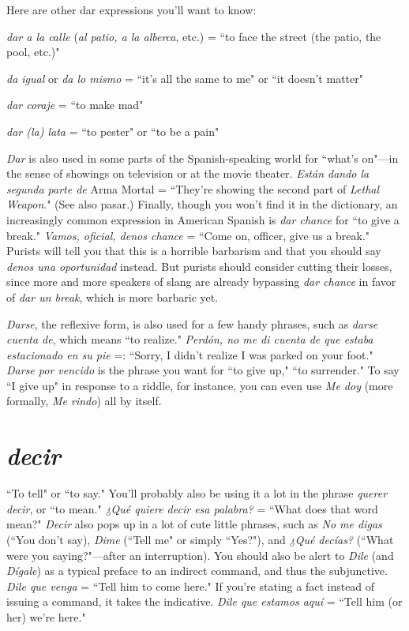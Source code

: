 Here are other dar expressions you'll want to know:

\bsk

\indu \emph{dar a la calle} (\emph{al patio, a la alberca}, etc.) = ``to face the street
(the patio, the pool, etc.)"

\indu \emph{da igual} or \emph{da lo mismo} = ``it's all the same to me" or ``it
doesn't matter"

\indu \emph{dar coraje} = ``to make mad"

\indu \emph{dar (la) lata} = ``to pester" or ``to be a pain"

\bsk

\emph{Dar} is also used in some parts of the Spanish-speaking world for
``what's on"---in the sense of showings on television or at the movie
theater. \emph{Están dando la segunda parte de} Arma Mortal = ``They're
showing the second part of \emph{Lethal Weapon}." (See also pasar.) Finally,
though you won't find it in the dictionary, an increasingly common expression in American Spanish is \emph{dar chance} for ``to give a break." \emph{Vamos, oficial, denos chance} = ``Come on, officer, give us a break." Purists will tell you that this is a horrible barbarism and that you should
say \emph{denos una oportunidad} instead. But purists should consider cutting their losses, since more and more speakers of slang are already bypassing \emph{dar chance} in favor of \emph{dar un break}, which is more barbaric yet.

\emph{Darse}, the reflexive form, is also used for a few handy phrases,
such as \emph{darse cuenta de}, which means ``to realize." \emph{Perdón, no me di
cuenta de que estaba estacionado en su pie} =: ``Sorry, I didn't realize
I was parked on your foot." \emph{Darse por vencido} is the phrase you want
for ``to give up," ``to surrender." To say ``I give up" in response to a
riddle, for instance, you can even use \emph{Me doy} (more formally, \emph{Me rindo}) all by itself.

\section{\emph{decir}}

``To tell" or ``to say." You'll probably also be using it a lot in
the phrase \emph{querer decir}, or ``to mean." \emph{¿Qué quiere decir esa palabra?}
= ``What does that word mean?" \emph{Decir} also pops up in a lot of cute
little phrases, such as \emph{No me digas} (``You don't say), \emph{Dime} (``Tell me"
or simply ``Yes?"), and \emph{¿Qué decías?} (``What were you saying?"---after
an interruption). You should also be alert to \emph{Dile} (and \emph{Dígale}) as a typical preface to an indirect command, and thus the subjunctive. \emph{Dile que
venga} = ``Tell him to come here." If you're stating a fact instead of
issuing a command, it takes the indicative. \emph{Dile que estamos aquí} =
``Tell him (or her) we're here."

